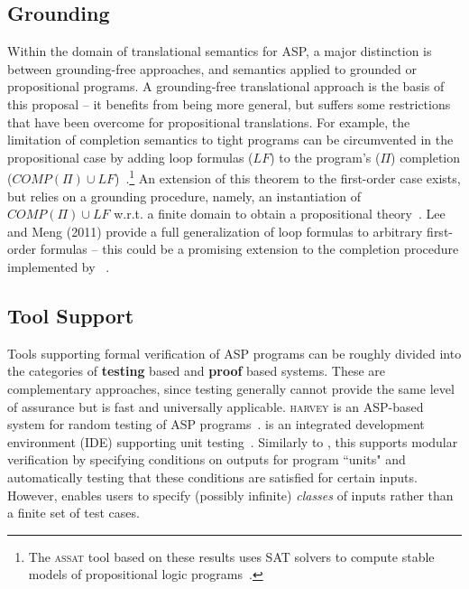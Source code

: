 \subsection{Grounding}
Within the domain of translational semantics for ASP, a major distinction is between grounding-free approaches, and semantics applied to grounded or propositional programs.
%
A grounding-free translational approach is the basis of this proposal -- it benefits from being more general, but suffers some restrictions that have been overcome for propositional translations.
%
For example, the limitation of completion semantics to tight programs can be circumvented in the propositional case by adding loop formulas ($LF$) to the program's ($\Pi$) completion ($COMP(\Pi) \cup LF$)~\cite[Theorem 1]{linzhao04}.\footnote{The \textsc{assat} tool based on these results uses SAT solvers to compute stable models of propositional logic programs~\cite{linzhao04}.}
%
An extension of this theorem to the first-order case exists, but relies on a grounding procedure, namely, an instantiation of $COMP(\Pi) \cup LF$ w.r.t. a finite domain to obtain a propositional theory~\cite{chenlinwanzha06}.
%
Lee and Meng (2011) provide a full generalization of loop formulas to arbitrary first-order formulas -- this could be a promising extension to the completion procedure implemented by \anthem~\cite{leemeng11}.


\subsection{Tool Support}
Tools supporting formal verification of ASP programs can be roughly divided into the categories of \textbf{testing} based and \textbf{proof} based systems.
These are complementary approaches, since testing generally cannot provide the same level of assurance but is fast and universally applicable.
\textsc{harvey} is an ASP-based system for random testing of ASP programs~\cite{greoettom17}.
\aspide is an integrated development environment (IDE) supporting unit testing~\cite{ameberric21,febleorearic13}.
Similarly to \anthem, this supports modular verification by specifying conditions on outputs for program ``units" and automatically testing that these conditions are satisfied for certain inputs.
However, \anthem enables users to specify (possibly infinite) \emph{classes} of inputs rather than a finite set of test cases.



